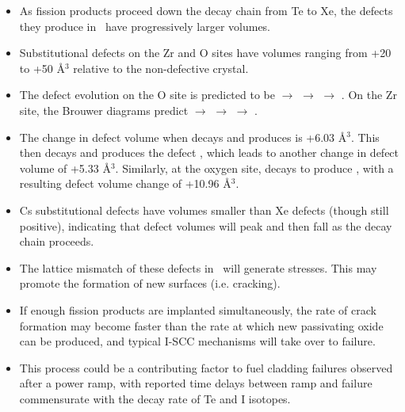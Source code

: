 \begin{itemize}
\item As fission products proceed down the decay chain from Te to Xe, the defects they produce in \zirconia\ have progressively larger volumes. 
\item Substitutional defects on the Zr and O sites have volumes ranging from +20 to +50 \r{A}$^{3}$ relative to the non-defective crystal.
\item The defect evolution on the O site is predicted to be  $\rightarrow$  $\rightarrow$  $\rightarrow$ . On the Zr site, the Brouwer diagrams predict  $\rightarrow$  $\rightarrow$  $\rightarrow$ . 
\item The change in defect volume when  decays and produces  is +6.03 \r{A}$^{3}$. This then decays and produces the defect , which leads to another change in defect volume of +5.33 \r{A}$^{3}$. Similarly, at the oxygen site,  decays to produce , with a resulting defect volume change of +10.96 \r{A}$^{3}$. 
\item Cs substitutional defects have volumes smaller than Xe defects (though still positive), indicating that defect volumes will peak and then fall as the decay chain proceeds.
\item The lattice mismatch of these defects in \zirconia\ will generate stresses. This may promote the formation of new surfaces (i.e. cracking).
\item If enough fission products are implanted simultaneously, the rate of crack formation may become faster than the rate at which new passivating oxide can be produced, and typical I-SCC mechanisms will take over to failure.
\item This process could be a contributing factor to fuel cladding failures observed after a power ramp, with reported time delays between ramp and failure commensurate with the decay rate of Te and I isotopes. 
\end{itemize}



